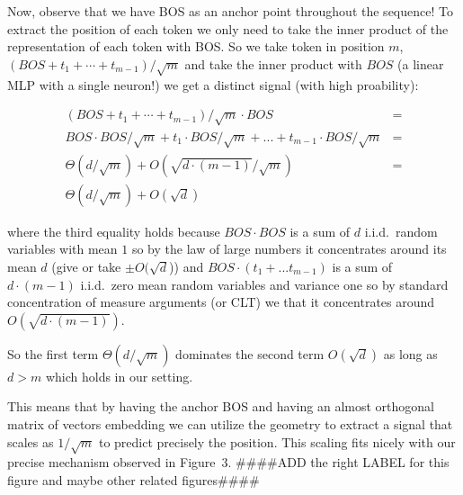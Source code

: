 \documentclass{article}
\theoremstyle{plain}
\theoremstyle{definition}
\theoremstyle{remark}
\begin{document}
Now, observe that we have BOS as an anchor point throughout the sequence! To extract the position of each token we only need to take the inner product of the representation of each token with BOS.
So we take token in position $m$, $(BOS + t_1 + \cdots + t_{m-1})/\sqrt{m} $ and take the inner product with $BOS$ (a linear MLP with a single neuron!) we get a  distinct signal (with high proability): 

\begin{align}
    (BOS + t_1 + \cdots + t_{m-1})/\sqrt{m} \cdot BOS &= \\
    BOS\cdot BOS/\sqrt{m} + t_1\cdot BOS/\sqrt{m} +...+ t_{m-1}\cdot BOS/ \sqrt{m} &= \\
    \Theta(d/\sqrt{m}) + O(\sqrt{d\cdot(m-1)}/\sqrt{m}) &= \\
     \Theta(d/\sqrt{m}) + O(\sqrt{d})
    \end{align}

    where the third equality holds because $BOS\cdot BOS$ is a sum of $d$ i.i.d.\ random variables with mean $1$ so by the law of large numbers it concentrates around its mean $d$ (give or take $\pm O(\sqrt{d}$)) and $BOS\cdot( t_1 +... t_{m-1}   ) $ is a sum of $d\cdot(m-1)$ i.i.d.\ zero mean random variables and variance one so by standard concentration of measure arguments (or CLT) we that it concentrates around $O(\sqrt{d\cdot(m-1)} )$.

    So the first term $\Theta(d/\sqrt{m})$ dominates the second term   $O(\sqrt{d})$  as long as $d>m$ which holds in our setting.

    This means that by having the anchor BOS and having an almost orthogonal matrix  of vectors embedding we can utilize the geometry to extract a signal that scales as $1/\sqrt{m}$ to predict precisely the position. This scaling fits nicely with our precise mechanism observed in Figure~3. ####ADD the right LABEL for this figure and maybe other related figures####








\end{document}
